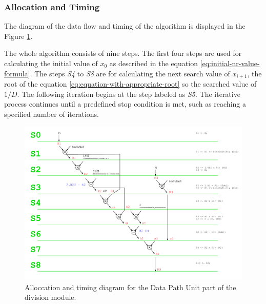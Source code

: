 \documentclass[a4paper, twoside, 11pt]{article}
\newcommand{\fbar}{\FloatBarrier}
\begin{document}
\subsubsection{Allocation and Timing}\label{subsubsec:division-allocation-and-timing}
The diagram of the data flow and timing of the algorithm is displayed in the Figure \ref{fig:division-allocation-timing}.\par
The whole algorithm consists of nine steps. The first four steps are used for calculating the initial value of $x_0$ as described in the equation \ref{eq:initial-nr-value-formula}. The steps \textit{S4} to \textit{S8} are for calculating the next search value of $x_{i+1}$, the root of the equation \ref{eq:equation-with-appropriate-root} so the searched value of $1/D$. The following iteration begins at the step labeled as \textit{S5}. The iterative process continues until a predefined stop condition is met, such as reaching a specified number of iterations.
\begin{figure}[htbp!]
  \centering
  \includegraphics[width=1\textwidth]{src/pdf/allocation-timing.pdf}
   \caption{Alloccation and timing diagram for the Data Path Unit part of the division module.}
  \label{fig:division-allocation-timing}
\end{figure}

\fbar
\end{document}
